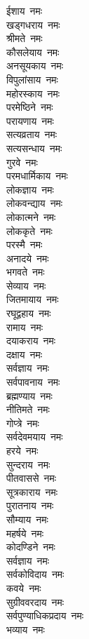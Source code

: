 \begin{multicols}{2}
\begin{flushleft}
ईशाय~नमः\\
खड्गधराय~नमः\\
श्रीमते~नमः\\
कौसलेयाय~नमः\\
अनसूयकाय~नमः\\
विपुलांसाय~नमः\\
महोरस्काय~नमः\\
परमेष्ठिने~नमः\hfill{}\\
परायणाय~नमः\\
सत्यव्रताय~नमः\\
सत्यसन्धाय~नमः\\
गुरवे~नमः\\
परमधार्मिकाय~नमः\\
लोकज्ञाय~नमः\\
लोकवन्द्याय~नमः\\
लोकात्मने~नमः\\
लोककृते~नमः\\
परस्मै~नमः\hfill{}\\
अनादये~नमः\\
भगवते~नमः\\
सेव्याय~नमः\\
जितमायाय~नमः\\
रघूद्वहाय~नमः\\
रामाय~नमः\\
दयाकराय~नमः\\
दक्षाय~नमः\\
सर्वज्ञाय~नमः\\
सर्वपावनाय~नमः\hfill{}\\
ब्रह्मण्याय~नमः\\
नीतिमते~नमः\\
गोप्त्रे~नमः\\
सर्वदेवमयाय~नमः\\
हरये~नमः\\
सुन्दराय~नमः\\
पीतवाससे~नमः\\
सूत्रकाराय~नमः\\
पुरातनाय~नमः\\
सौम्याय~नमः\hfill{}\\
महर्षये~नमः\\
कोदण्डिने~नमः\\
सर्वज्ञाय~नमः\\
सर्वकोविदाय~नमः\\
कवये~नमः\\
सुग्रीववरदाय~नमः\\
सर्वपुण्याधिकप्रदाय~नमः\\
भव्याय~नमः\\

\end{flushleft}
\end{multicols}
